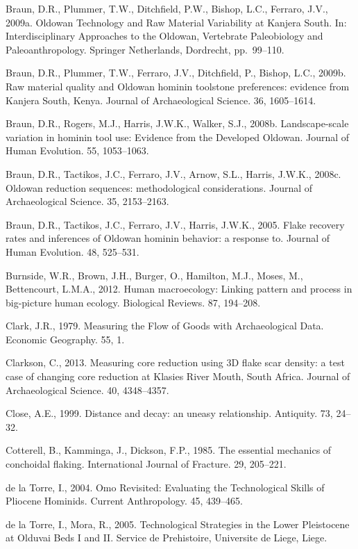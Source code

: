 \documentclass[]{elsarticle} %
\begin{document}
Braun, D.R., Plummer, T.W., Ditchfield, P.W., Bishop, L.C., Ferraro,
J.V., 2009a. Oldowan Technology and Raw Material Variability at Kanjera
South. In: Interdisciplinary Approaches to the Oldowan, Vertebrate
Paleobiology and Paleoanthropology. Springer Netherlands, Dordrecht,
pp.~99--110.

Braun, D.R., Plummer, T.W., Ferraro, J.V., Ditchfield, P., Bishop, L.C.,
2009b. Raw material quality and Oldowan hominin toolstone preferences:
evidence from Kanjera South, Kenya. Journal of Archaeological Science.
36, 1605--1614.

Braun, D.R., Rogers, M.J., Harris, J.W.K., Walker, S.J., 2008b.
Landscape-scale variation in hominin tool use: Evidence from the
Developed Oldowan. Journal of Human Evolution. 55, 1053--1063.

Braun, D.R., Tactikos, J.C., Ferraro, J.V., Arnow, S.L., Harris, J.W.K.,
2008c. Oldowan reduction sequences: methodological considerations.
Journal of Archaeological Science. 35, 2153--2163.

Braun, D.R., Tactikos, J.C., Ferraro, J.V., Harris, J.W.K., 2005. Flake
recovery rates and inferences of Oldowan hominin behavior: a response
to. Journal of Human Evolution. 48, 525--531.

Burnside, W.R., Brown, J.H., Burger, O., Hamilton, M.J., Moses, M.,
Bettencourt, L.M.A., 2012. Human macroecology: Linking pattern and
process in big-picture human ecology. Biological Reviews. 87, 194--208.

Clark, J.R., 1979. Measuring the Flow of Goods with Archaeological Data.
Economic Geography. 55, 1.

Clarkson, C., 2013. Measuring core reduction using 3D flake scar
density: a test case of changing core reduction at Klasies River Mouth,
South Africa. Journal of Archaeological Science. 40, 4348--4357.

Close, A.E., 1999. Distance and decay: an uneasy relationship.
Antiquity. 73, 24--32.

Cotterell, B., Kamminga, J., Dickson, F.P., 1985. The essential
mechanics of conchoidal flaking. International Journal of Fracture. 29,
205--221.

de la Torre, I., 2004. Omo Revisited: Evaluating the Technological
Skills of Pliocene Hominids. Current Anthropology. 45, 439--465.

de la Torre, I., Mora, R., 2005. Technological Strategies in the Lower
Pleistocene at Olduvai Beds I and II. Service de Prehistoire, Universite
de Liege, Liege.
\end{document}

